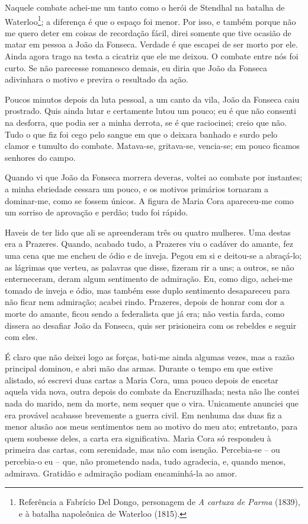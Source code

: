 Naquele combate achei-me um tanto como o herói de Stendhal na batalha de
Waterloo\footnote{Referência a Fabrício Del Dongo, personagem de \emph{A
  cartuxa de Parma} (1839), e à batalha napoleônica de Waterloo (1815).};
a diferença é que o espaço foi menor. Por isso, e também porque não me
quero deter em coisas de recordação fácil, direi somente que tive
ocasião de matar em pessoa a João da Fonseca. Verdade é que escapei de
ser morto por ele. Ainda agora trago na testa a cicatriz que ele me
deixou. O combate entre nós foi curto. Se não parecesse romanesco
demais, eu diria que João da Fonseca adivinhara o motivo e previra o
resultado da ação.

Poucos minutos depois da luta pessoal, a um canto da vila, João da
Fonseca caiu prostrado. Quis ainda lutar e certamente lutou um pouco; eu
é que não consenti na desforra, que podia ser a minha derrota, se é que
raciocinei; creio que não. Tudo o que fiz foi cego pelo sangue em que o
deixara banhado e surdo pelo clamor e tumulto do combate. Matava-se,
gritava-se, vencia-se; em pouco ficamos senhores do campo.

Quando vi que João da Fonseca morrera deveras, voltei ao combate por
instantes; a minha ebriedade cessara um pouco, e os motivos primários
tornaram a dominar-me, como se fossem únicos. A figura de Maria Cora
apareceu-me como um sorriso de aprovação e perdão; tudo foi rápido.

Haveis de ter lido que ali se apreenderam três ou quatro mulheres. Uma
destas era a Prazeres. Quando, acabado tudo, a Prazeres viu o cadáver do
amante, fez uma cena que me encheu de ódio e de inveja. Pegou em si e
deitou-se a abraçá-lo; as lágrimas que verteu, as palavras que disse,
fizeram rir a uns; a outros, se não enterneceram, deram algum sentimento
de admiração. Eu, como digo, achei-me tomado de inveja e ódio, mas
também esse duplo sentimento desapareceu para não ficar nem admiração;
acabei rindo. Prazeres, depois de honrar com dor a morte do amante,
ficou sendo a federalista que já era; não vestia farda, como dissera ao
desafiar João da Fonseca, quis ser prisioneira com os rebeldes e seguir
com eles.

É claro que não deixei logo as forças, bati-me ainda algumas vezes, mas
a razão principal dominou, e abri mão das armas. Durante o tempo em que
estive alistado, só escrevi duas cartas a Maria Cora, uma pouco depois
de encetar aquela vida nova, outra depois do combate da Encruzilhada;
nesta não lhe contei nada do marido, nem da morte, nem sequer que o
vira. Unicamente anunciei que era provável acabasse brevemente a guerra
civil. Em nenhuma das duas fiz a menor alusão aos meus sentimentos nem
ao motivo do meu ato; entretanto, para quem soubesse deles, a carta era
significativa. Maria Cora só respondeu à primeira das cartas, com
serenidade, mas não com isenção. Percebia-se -- ou percebia-o eu -- que,
não prometendo nada, tudo agradecia, e, quando menos, admirava. Gratidão
e admiração podiam encaminhá-la ao amor.

